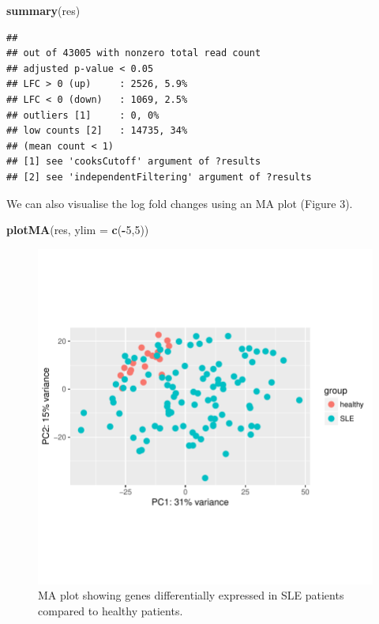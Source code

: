\documentclass[9pt,a4paper,]{extarticle}
\newenvironment{Shaded}{\begin{snugshade}}{\end{snugshade}}
\newcommand{\KeywordTok}[1]{\textcolor[rgb]{0.13,0.29,0.53}{\textbf{#1}}}
\newcommand{\DataTypeTok}[1]{\textcolor[rgb]{0.13,0.29,0.53}{#1}}
\newcommand{\DecValTok}[1]{\textcolor[rgb]{0.00,0.00,0.81}{#1}}
\newcommand{\OperatorTok}[1]{\textcolor[rgb]{0.81,0.36,0.00}{\textbf{#1}}}
\newcommand{\NormalTok}[1]{#1}
\begin{document}
\begin{Shaded}
\begin{Highlighting}[]
\KeywordTok{summary}\NormalTok{(res)}
\end{Highlighting}
\end{Shaded}

\begin{verbatim}
## 
## out of 43005 with nonzero total read count
## adjusted p-value < 0.05
## LFC > 0 (up)     : 2526, 5.9% 
## LFC < 0 (down)   : 1069, 2.5% 
## outliers [1]     : 0, 0% 
## low counts [2]   : 14735, 34% 
## (mean count < 1)
## [1] see 'cooksCutoff' argument of ?results
## [2] see 'independentFiltering' argument of ?results
\end{verbatim}

We can also visualise the log fold changes using an MA plot (Figure 3).

\begin{Shaded}
\begin{Highlighting}[]
\KeywordTok{plotMA}\NormalTok{(res, }\DataTypeTok{ylim =} \KeywordTok{c}\NormalTok{(}\OperatorTok{-}\DecValTok{5}\NormalTok{,}\DecValTok{5}\NormalTok{))}
\end{Highlighting}
\end{Shaded}

\begin{figure}

{\centering \includegraphics{biocondutor-regulatory-genomics-workflow_files/figure-latex/figure3-1} 

}

\caption{MA plot showing genes differentially expressed in SLE patients compared to healthy patients.}\label{fig:figure3}
\end{figure}
\end{document}
